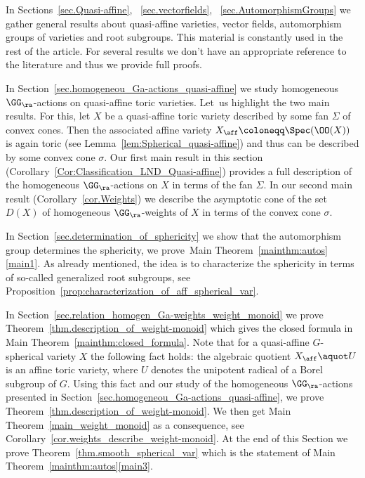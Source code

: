 In Sections~\ref{sec.Quasi-affine}, ~\ref{sec.vectorfields}, ~\ref{sec.AutomorphismGroups}
we gather general results about quasi-affine varieties,
vector fields, automorphism groups of varieties and root subgroups.
This material is constantly used in the rest of the article.
For several results we don't have an appropriate reference to the literature and
thus we provide full proofs.

In Section~\ref{sec.homogeneou_Ga-actions_quasi-affine} we study homogeneous $\GG_\ra$-actions
on quasi-affine toric varieties. Let~us highlight the two main results. For this, let
$X$ be a quasi-affine toric variety described by some fan $\Sigma$ of convex cones.
Then the associated affine variety $X_{\aff} \coloneqq \Spec(\OO(X))$
is again toric (see Lemma~\ref{lem:Spherical_quasi-affine}) and thus can
be described by some convex cone $\sigma$.
Our first main result in this section (Corollary~\ref{Cor:Classification_LND_Quasi-affine})
provides
a full description of the homogeneous $\GG_\ra$-actions on $X$ in terms of the fan $\Sigma$.
In our second main result (Corollary~\ref{cor.Weights})
we describe the asymptotic cone of the set $D(X)$
of homogeneous $\GG_\ra$-weights of $X$ in terms of the convex cone $\sigma$.

In Section~\ref{sec.determination_of_sphericity} we show that the automorphism
group determines the sphericity, \ie we prove~Main Theorem~\ref{mainthm:autos}\eqref{main1}.
As already mentioned, the idea is to characterize the sphericity in terms of so-called
generalized root subgroups, see Proposition~\ref{prop:characterization_of_aff_spherical_var}.

In Section~\ref{sec.relation_homogen_Ga-weights_weight_monoid} we prove
Theorem~\ref{thm.description_of_weight-monoid} which gives the closed formula
in Main Theorem~\ref{mainthm:closed_formula}. Note that
for a quasi-affine $G$-spherical variety $X$ the following fact holds:
the algebraic quotient $X_{\aff} \aquot U$ is an affine toric variety, where $U$ denotes
the unipotent radical of a Borel subgroup of $G$. Using this fact
and our study of the
homogeneous $\GG_\ra$-actions presented in Section~\ref{sec.homogeneou_Ga-actions_quasi-affine},
we prove Theorem~\ref{thm.description_of_weight-monoid}. We then get
Main Theorem~\ref{main_weight_monoid} as a consequence, see Corollary~\ref{cor.weights_describe_weight-monoid}. At the end of this Section we prove
Theorem~\ref{thm.smooth_spherical_var} which is the statement of Main Theorem~\ref{mainthm:autos}\eqref{main3}.

